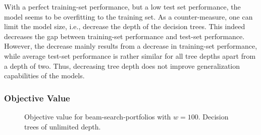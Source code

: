 \documentclass[conference]{IEEEtran}
\begin{document}
With a perfect training-set performance, but a low test set performance, the model seems to be overfitting to the training set.
As a counter-measure, one can limit the model size, i.e., decrease the depth of the decision trees.
This indeed decreases the gap between training-set performance and test-set performance.
However, the decrease mainly results from a decrease in training-set performance, while average test-set performance is rather similar for all tree depths apart from a depth of two.
Thus, decreasing tree depth does not improve generalization capabilities of the models.

\subsubsection{Objective Value}

\begin{figure}[t]
	\centering
	\hfil
	\caption{Objective value for beam-search-portfolios with $w=100$. Decision trees of unlimited depth.}
	\label{fig:objective-prediction}
\end{figure}
\end{document}
